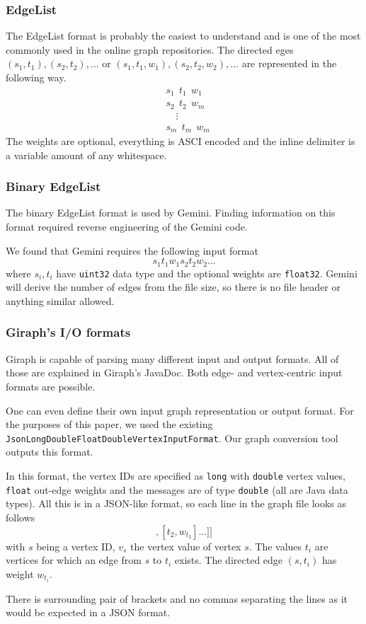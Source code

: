 \subsubsection{EdgeList}
The EdgeList format is probably the easiest to understand and is one of the most commonly used in the online graph repositories. The directed eges $(s_1,t_1),(s_2,t_2),\ldots$ or $(s_1,t_1, w_1),(s_2,t_2, w_2),\ldots$ are represented in the following way.
\begin{align*}
  &s_1\ \ t_1\ \ w_1\\
  &s_2\ \ t_2\ \ w_m\\
	&\quad\vdots\\
  &s_m\ \ t_m\ \ w_m
\end{align*}
The weights are optional, everything is ASCI encoded and the inline delimiter is a variable amount of any whitespace.

\subsubsection{Binary EdgeList}
The binary EdgeList format is used by Gemini. Finding information on this format required reverse engineering of the Gemini code.

We found that Gemini requires the following input format
\begin{equation*}
	s_1t_1w_1s_2t_2w_2\ldots
\end{equation*}
where $s_i,t_i$ have \texttt{uint32} data type and the optional weights are \texttt{float32}.
Gemini will derive the number of edges from the file size, so there is no file header or anything similar allowed.

\subsubsection{Giraph's I/O formats}
Giraph is capable of parsing many different input and output formats. All of those are explained in Giraph's JavaDoc.
Both edge- and vertex-centric input formats are possible.

One can even define their own input graph representation or output format. For the purposes of this paper, we used the existing \texttt{JsonLongDoubleFloatDoubleVertexInputFormat}\cite{GiraphInputFormat}.
Our graph conversion tool outputs this format.

In this format, the vertex IDs are specified as \texttt{long} with \texttt{double} vertex values, \texttt{float} out-edge weights and the messages are of type \texttt{double} (all are Java data types).
All this is in a JSON-like format, so each line in the graph file looks as follows
\begin{equation*}
	[s,v_s,[[t_1, w_{t_1}], [t_2, w_{t_2}]...]]
\end{equation*}
with $s$ being a vertex ID, $v_s$ the vertex value of vertex $s$. The values $t_i$ are vertices for which an edge from $s$ to $t_i$ exists. The directed edge $(s,t_i)$ has weight $w_{t_i}$.

There is surrounding pair of brackets and no commas separating the lines as it would be expected in a JSON format.
